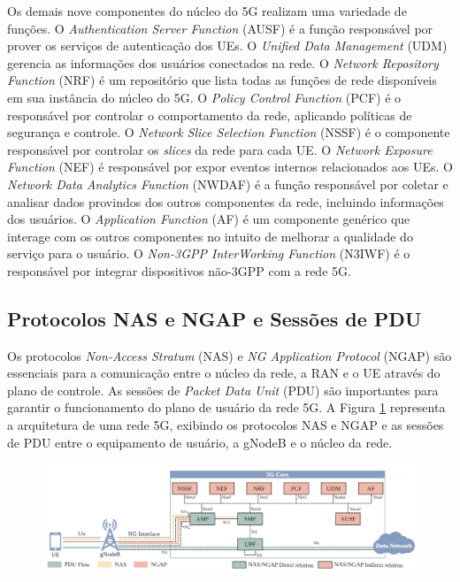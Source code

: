 Os demais nove componentes do núcleo do 5G realizam uma variedade de funções.
O \textit{Authentication Server Function} (AUSF) é a função responsável por prover os serviços de autenticação dos UEs.
O \textit{Unified Data Management} (UDM) gerencia as informações dos usuários conectados na rede.
O \textit{Network Repository Function} (NRF) é um repositório que lista todas as funções de rede disponíveis em sua instância do núcleo do 5G.
O \textit{Policy Control Function} (PCF) é o responsável por controlar o comportamento da rede, aplicando políticas de segurança e controle.
O \textit{Network Slice Selection Function} (NSSF) é o componente responsável por controlar os \textit{slices} da rede para cada UE.
O \textit{Network Exposure Function} (NEF) é responsável por expor eventos internos relacionados aos UEs.
O \textit{Network Data Analytics Function} (NWDAF) é a função responsável por coletar e analisar dados provindos dos outros componentes da rede, incluindo informações dos usuários.
O \textit{Application Function} (AF) é um componente genérico que interage com os outros componentes no intuito de melhorar a qualidade do serviço para o usuário.
O \textit{Non-3GPP InterWorking Function} (N3IWF) é o responsável por integrar dispositivos não-3GPP com a rede 5G.

\subsection{Protocolos NAS e NGAP e Sessões de PDU}

Os protocolos \textit{Non-Access Stratum} (NAS) e \textit{NG Application Protocol} (NGAP) são essenciais para a comunicação entre o núcleo da rede, a RAN e o UE através do plano de controle.
As sessões de \textit{Packet Data Unit} (PDU) são importantes para garantir o funcionamento do plano de usuário da rede 5G.
A Figura \ref{fig:5Gprotocols} representa a arquitetura de uma rede 5G, exibindo os protocolos NAS e NGAP e as sessões de PDU entre o equipamento de usuário, a gNodeB e o núcleo da rede.

\begin{figure}[!ht]
    \centering
    \includegraphics[width=1\textwidth]{TG2/Chapters/Background/Figures/Background-5GSystemProtocols.png}
    \label{fig:5Gprotocols}
\end{figure}

